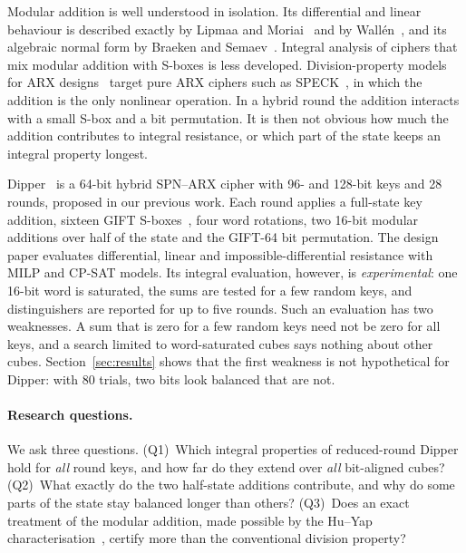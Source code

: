 \documentclass[11pt,a4paper]{article}
\theoremstyle{definition}
\theoremstyle{remark}
\begin{document}
Modular addition is well understood in isolation. Its differential and linear behaviour is described exactly by Lipmaa and Moriai~\cite{lipmaa2001} and by Wallén~\cite{wallen2003}, and its algebraic normal form by Braeken and Semaev~\cite{braeken2005}. Integral analysis of ciphers that mix modular addition with S-boxes is less developed. Division-property models for ARX designs~\cite{sun2016arx,sun2017sat} target pure ARX ciphers such as SPECK~\cite{simonspeck2015}, in which the addition is the only nonlinear operation. In a hybrid round the addition interacts with a small S-box and a bit permutation. It is then not obvious how much the addition contributes to integral resistance, or which part of the state keeps an integral property longest.

Dipper~\cite{dipper2026} is a 64-bit hybrid SPN--ARX cipher with 96- and 128-bit keys and 28 rounds, proposed in our previous work. Each round applies a full-state key addition, sixteen GIFT S-boxes~\cite{gift2017}, four word rotations, two 16-bit modular additions over half of the state and the GIFT-64 bit permutation. The design paper evaluates differential, linear and impossible-differential resistance with MILP and CP-SAT models. Its integral evaluation, however, is \emph{experimental}: one 16-bit word is saturated, the sums are tested for a few random keys, and distinguishers are reported for up to five rounds. Such an evaluation has two weaknesses. A sum that is zero for a few random keys need not be zero for all keys, and a search limited to word-saturated cubes says nothing about other cubes. Section~\ref{sec:results} shows that the first weakness is not hypothetical for Dipper: with 80 trials, two bits look balanced that are not.

\paragraph{Research questions.} We ask three questions.
(Q1)~Which integral properties of reduced-round Dipper hold for \emph{all} round keys, and how far do they extend over \emph{all} bit-aligned cubes?
(Q2)~What exactly do the two half-state additions contribute, and why do some parts of the state stay balanced longer than others?
(Q3)~Does an exact treatment of the modular addition, made possible by the Hu--Yap characterisation~\cite{huyap2024}, certify more than the conventional division property?
\end{document}

